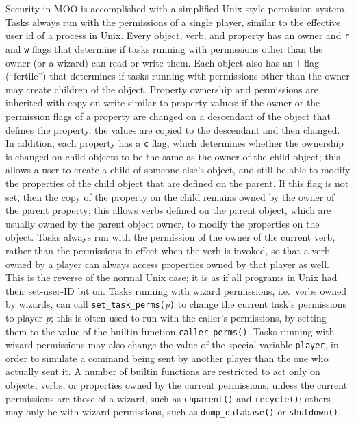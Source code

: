 \documentclass{article}
\begin{document}
Security in MOO is accomplished with a simplified Unix-style
permission system.  Tasks always run with the permissions of a single
player, similar to the effective user id of a process in Unix.  Every
object, verb, and property has an owner and \texttt{r} and \texttt{w}
flags that determine if tasks running with permissions other than the
owner (or a wizard) can read or write them.  Each object also has an
\texttt{f} flag (``fertile'') that determines if tasks running with
permissions other than the owner may create children of the object.
Property ownership and permissions are inherited with copy-on-write
similar to property values: if the owner or the permission flags of a
property are changed on a descendant of the object that defines the
property, the values are copied to the descendant and then changed.
In addition, each property has a \texttt{c} flag, which determines
whether the ownership is changed on child objects to be the same as
the owner of the child object; this allows a user to create a child of
someone else's object, and still be able to modify the properties of
the child object that are defined on the parent.  If this flag is not
set, then the copy of the property on the child remains owned by the
owner of the parent property; this allows verbs defined on the parent
object, which are usually owned by the parent object owner, to modify
the properties on the object.  Tasks always run with the permission of
the owner of the current verb, rather than the permissions in effect
when the verb is invoked, so that a verb owned by a player can always
access properties owned by that player as well.  This is the reverse
of the normal Unix case; it is as if all programs in Unix had their
set-user-ID bit on.  Tasks running with wizard permissions, i.e.~verbs
owned by wizards, can call
\texttt{set\_task\_perms(}\textit{p}\texttt{)} to change the current
task's permissions to player \textit{p}; this is often used to run
with the caller's permissions, by setting them to the value of the
builtin function \texttt{caller\_perms()}.  Tasks running with wizard
permissions may also change the value of the special variable
\texttt{player}, in order to simulate a command being sent by another player 
than the one who actually sent it.  A number of builtin functions are
restricted to act only on objects, verbs, or properties owned by the
current permissions, unless the current permissions are those of a
wizard, such as \texttt{chparent()} and \texttt{recycle()}; others
may only be with wizard permissions, such as \texttt{dump\_database()}
or \texttt{shutdown()}.
\end{document}
